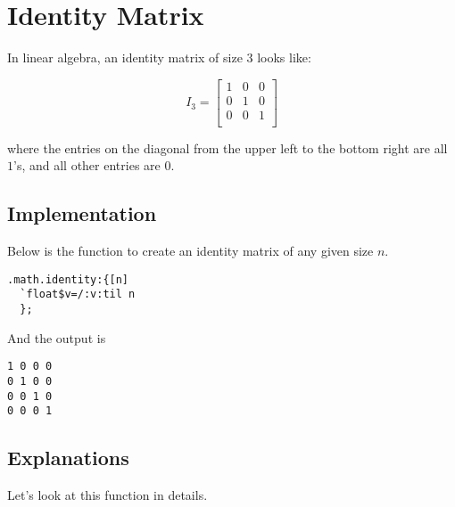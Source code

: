 \section{Identity Matrix}
\label{example:LinearInterpolcation}

In linear algebra, an identity matrix of size 3 looks like:

$$
I_3 = \left[
\begin{matrix}
1 & 0 & 0\\
0 & 1 & 0\\
0 & 0 & 1\\
\end{matrix}
\right]
$$

where the entries on the diagonal from the upper left to the bottom right are all $1$'s, and all other entries are $0$.


\subsection{Implementation}
Below is the function to create an identity matrix of any given size $n$.

\begin{verbatim}
.math.identity:{[n]
  `float$v=/:v:til n
  };
\end{verbatim}

And the output  is

\begin{verbatim}
1 0 0 0 
0 1 0 0 
0 0 1 0 
0 0 0 1 
\end{verbatim}


\subsection{Explanations}
Let's look at this function in details.

